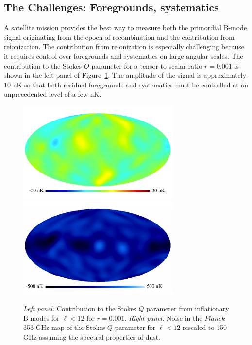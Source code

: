 \subsection{The Challenges: Foregrounds, systematics}
\label{sec:foregrounds}
\vspace{-0.05in}

A satellite mission provides the best way to measure both the primordial B-mode signal originating from the epoch of recombination and the contribution from reionization. The contribution from reionization is especially challenging because it requires control over foregrounds and systematics on large angular scales. The contribution to the Stokes $Q$-parameter for a tensor-to-scalar ratio $r=0.001$ is shown in the left panel of Figure~\ref{fig:Qrp001}. The amplitude of the signal is approximately $10$ nK so that both residual foregrounds and systematics must be controlled at an unprecedented level of a few nK.

\begin{figure}[h]
\begin{center}
\includegraphics[width=3.2in]{Figures/P15_2_12_rp001.pdf}
\includegraphics[width=3.2in]{Figures/P353_N_2_12.pdf}
\end{center}
\caption{{\it Left panel:} Contribution to the Stokes $Q$ parameter from inflationary B-modes for $\ell<12$ for $r=0.001$. {\it Right panel:} Noise in the $Planck$ 353 GHz map of the Stokes $Q$ parameter for $\ell<12$ rescaled to 150 GHz assuming the spectral properties of dust.}
\label{fig:Qrp001}
\end{figure}
